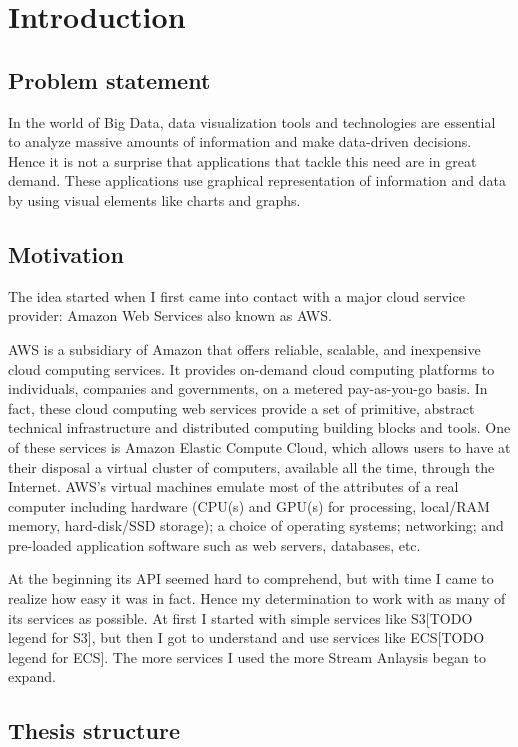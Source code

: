 \chapter{Introduction}
\label{chap:01}

\section{Problem statement}
\label{chap:01:03}
In the world of Big Data, data visualization tools and technologies are essential to analyze massive amounts of information and make data-driven decisions. Hence it is not a surprise that applications that tackle this need are in great demand. These applications use graphical representation of information and data by using visual elements like charts and graphs.

\section{Motivation}
\label{chap:01:02}
The idea started when I first came into contact with a major cloud service provider: Amazon Web Services also known as AWS.

AWS is a subsidiary of Amazon that offers reliable, scalable, and inexpensive cloud computing services. It provides on-demand cloud computing platforms to individuals, companies and governments, on a metered pay-as-you-go basis. In fact, these cloud computing web services provide a set of primitive, abstract technical infrastructure and distributed computing building blocks and tools. One of these services is Amazon Elastic Compute Cloud, which allows users to have at their disposal a virtual cluster of computers, available all the time, through the Internet. AWS's virtual machines emulate most of the attributes of a real computer including hardware (CPU(s) and GPU(s) for processing, local/RAM memory, hard-disk/SSD storage); a choice of operating systems; networking; and pre-loaded application software such as web servers, databases, etc. \cite{aws-overview}

At the beginning its API seemed hard to comprehend, but with time I came to realize how easy it was in fact. Hence my determination to work with as many of its services as possible. At first I started with simple services like S3[TODO legend for S3], but then I got to understand and use services like ECS[TODO legend for ECS]. The more services I used the more Stream Anlaysis began to expand.

\section{Thesis structure}
\label{chap:01:03}


